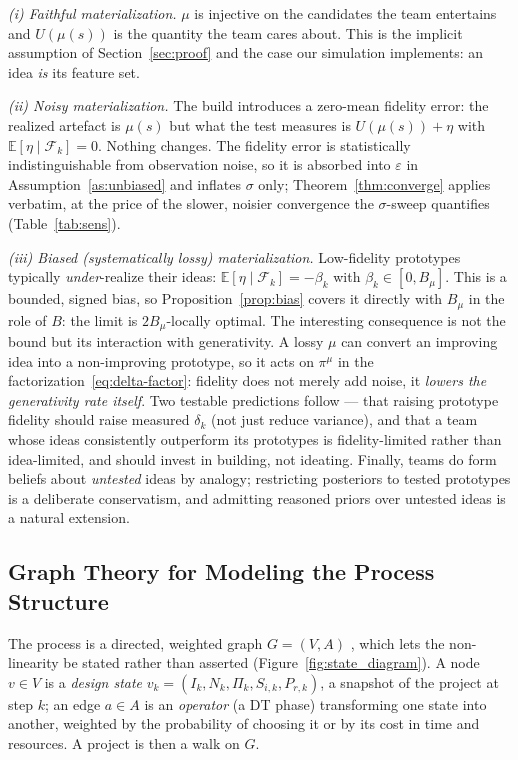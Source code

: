 \documentclass[11pt]{article}
\newcommand{\E}{\mathbb{E}}
\newcommand{\filt}{\mathcal{F}}     %
\begin{document}
\emph{(i) Faithful materialization.} $\mu$ is injective on the candidates the team entertains and $U(\mu(s))$ is the quantity the team cares about. This is the implicit assumption of Section~\ref{sec:proof} and the case our simulation implements: an idea \emph{is} its feature set.

\emph{(ii) Noisy materialization.} The build introduces a zero-mean fidelity error: the realized artefact is $\mu(s)$ but what the test measures is $U(\mu(s))+\eta$ with $\E[\eta\mid\filt_k]=0$. Nothing changes. The fidelity error is statistically indistinguishable from observation noise, so it is absorbed into $\varepsilon$ in Assumption~\ref{as:unbiased} and inflates $\sigma$ only; Theorem~\ref{thm:converge} applies verbatim, at the price of the slower, noisier convergence the $\sigma$-sweep quantifies (Table~\ref{tab:sens}).

\emph{(iii) Biased (systematically lossy) materialization.} Low-fidelity prototypes typically \emph{under}-realize their ideas: $\E[\eta\mid\filt_k]=-\beta_k$ with $\beta_k\in[0,B_\mu]$. This is a bounded, signed bias, so Proposition~\ref{prop:bias} covers it directly with $B_\mu$ in the role of $B$: the limit is $2B_\mu$-locally optimal. The interesting consequence is not the bound but its interaction with generativity. A lossy $\mu$ can convert an improving idea into a non-improving prototype, so it acts on $\pi^{\mu}$ in the factorization~\eqref{eq:delta-factor}: fidelity does not merely add noise, it \emph{lowers the generativity rate itself}. Two testable predictions follow --- that raising prototype fidelity should raise measured $\delta_k$ (not just reduce variance), and that a team whose ideas consistently outperform its prototypes is fidelity-limited rather than idea-limited, and should invest in building, not ideating. Finally, teams do form beliefs about \emph{untested} ideas by analogy; restricting posteriors to tested prototypes is a deliberate conservatism, and admitting reasoned priors over untested ideas is a natural extension.

\subsection{Graph Theory for Modeling the Process Structure}

The process is a directed, weighted graph $G=(V,A)$ \citep{mateosND, smith2024}, which lets the non-linearity be stated rather than asserted (Figure~\ref{fig:state_diagram}). A node $v\in V$ is a \emph{design state} $v_k=(I_k,N_k,\Pi_k,S_{i,k},P_{r,k})$, a snapshot of the project at step $k$; an edge $a\in A$ is an \emph{operator} (a DT phase) transforming one state into another, weighted by the probability of choosing it or by its cost in time and resources. A project is then a walk on $G$.
\end{document}
